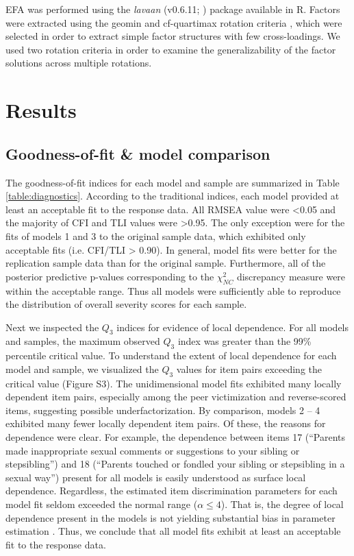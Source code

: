 \documentclass[letterpaper,man,natbib]{apa6}  %
\begin{document}
EFA was performed using the \textit{lavaan} (v0.6.11; \citealt{lavaan}) package available in R. Factors were extracted using the geomin \citep{yates1987multivariate} and cf-quartimax rotation criteria \citep{crawford1970general}, which were selected in order to extract simple factor structures with few cross-loadings. We used two rotation criteria in order to examine the generalizability of the factor solutions across multiple rotations. 

\section{Results}

\subsection{Goodness-of-fit \& model comparison}

The goodness-of-fit indices for each model and sample are summarized in Table \ref{table:diagnostics}. According to the traditional indices, each model provided at least an acceptable fit to the response data. All RMSEA value were <0.05 and the majority of CFI and TLI values were >0.95. The only exception were for the fits of models 1 and 3 to the original sample data, which exhibited only acceptable fits (i.e. CFI/TLI > 0.90). In general, model fits were better for the replication sample data than for the original sample. Furthermore, all of the posterior predictive p-values corresponding to the $\chi^2_{NC}$ discrepancy measure were within the acceptable range. Thus all models were sufficiently able to reproduce the distribution of overall severity scores for each sample.

Next we inspected the $Q_3$ indices for evidence of local dependence. For all models and samples, the maximum observed $Q_3$ index was greater than the 99\% percentile critical value. To understand the extent of local dependence for each model and sample, we visualized the $Q_3$ values for item pairs exceeding the critical value (Figure S3). The unidimensional model fits exhibited many locally dependent item pairs, especially among the peer victimization and reverse-scored items, suggesting possible underfactorization. By comparison, models 2 -- 4 exhibited many fewer locally dependent item pairs. Of these, the reasons for dependence were clear. For example, the dependence between items 17 (``Parents made inappropriate sexual comments or suggestions to your sibling or stepsibling'') and 18 (``Parents touched or fondled your sibling or stepsibling in a sexual way'') present for all models is easily understood as surface local dependence. Regardless, the estimated item discrimination parameters for each model fit seldom exceeded the normal range ($\alpha \leq 4$). That is, the degree of local dependence present in the models is not yielding substantial bias in parameter estimation \citep{edwards2018diagnostic}. Thus, we conclude that all model fits exhibit at least an acceptable fit to the response data.
\end{document}
